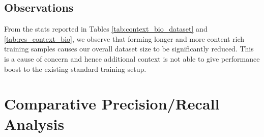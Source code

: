 \subsection{Observations}
From the stats reported in Tables \ref{tab:context_bio_dataset} and \ref{tab:res_context_bio}, we observe that forming longer and more content rich training samples causes our overall dataset size to be significantly reduced. This is a cause of concern and hence additional context is not able to give performance boost to the existing standard training setup.

\section{Comparative Precision/Recall Analysis}
